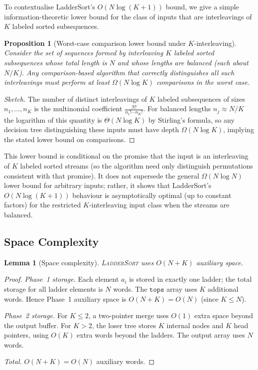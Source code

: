 \documentclass{ieeeaccess}
\theoremstyle{plain}
\newtheorem{lemma}[theorem]{Lemma}
\newtheorem{proposition}{Proposition}[section]
\theoremstyle{definition}
\newcommand{\tops}{\texttt{tops}}
\begin{document}
To contextualise LadderSort's $O(N\log(K+1))$ bound, we give a simple
information-theoretic lower bound for the class of inputs that are
interleavings of $K$ labeled sorted subsequences.

\begin{proposition}[Worst-case comparison lower bound under $K$-interleaving]
\label{prop:lowerbound}
Consider the set of sequences formed by interleaving $K$ labeled sorted
subsequences whose total length is $N$ and whose lengths are balanced
(each about $N/K$).  Any comparison-based algorithm that correctly
distinguishes all such interleavings must perform at least
\(\Omega(N\log K)\) comparisons in the worst case.
\end{proposition}

\begin{proof}[Sketch]
The number of distinct interleavings of $K$ labeled subsequences of sizes
$n_1,\dots,n_K$ is the multinomial coefficient
\(\frac{N!}{n_1!\cdots n_K!}\).  For balanced lengths $n_j\approx N/K$ the
logarithm of this quantity is $\Theta(N\log K)$ by Stirling's formula, so
any decision tree distinguishing these inputs must have depth
\(\Omega(N\log K)\), implying the stated lower bound on comparisons.
\end{proof}

This lower bound is conditional on the promise that the input is an
interleaving of $K$ labeled sorted streams (so the algorithm need only
distinguish permutations consistent with that promise).  It does not
supersede the general $\Omega(N\log N)$ lower bound for arbitrary inputs;
rather, it shows that LadderSort's $O(N\log(K+1))$ behaviour is asymptotically
optimal (up to constant factors) for the restricted $K$-interleaving input
class when the streams are balanced.

\subsection{Space Complexity}
\label{sec:space}

\begin{lemma}[Space complexity]
\label{lem:space}
\textsc{LadderSort} uses $O(N + K)$ auxiliary space.
\end{lemma}

\begin{proof}
\emph{Phase~1 storage.}  Each element $a_i$ is stored in exactly one
ladder; the total storage for all ladder elements is $N$ words.  The
$\tops$ array uses $K$ additional words.  Hence Phase~1 auxiliary space
is $O(N + K) = O(N)$ (since $K \le N$).

\emph{Phase~2 storage.}  For $K \le 2$, a two-pointer merge uses $O(1)$
extra space beyond the output buffer.  For $K > 2$, the loser tree
stores $K$ internal nodes and $K$ head pointers, using $O(K)$ extra words
beyond the ladders.  The output array uses $N$ words.

\emph{Total.}  $O(N + K) = O(N)$ auxiliary words.
\end{proof}
\end{document}
